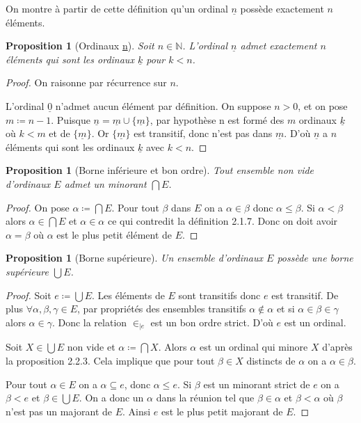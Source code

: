 \documentclass[french]{article}
\theoremstyle{definition}
\theoremstyle{plain}
\newtheorem{proposition}[subsubsection]{Proposition}
\theoremstyle{plain}
\theoremstyle{plain}
\theoremstyle{plain}
\theoremstyle{plain}
\begin{document}
On montre à partir de cette définition qu'un ordinal \( \underline{n} \) possède exactement \( n \) éléments.
\begin{proposition}[Ordinaux \underline{n}]
	Soit \( n \in \mathbb{N} \). L'ordinal \( \underline{n} \) admet exactement \( n \) éléments qui sont les ordinaux \( \underline{k} \) pour \( k < n \).
\end{proposition}
\begin{proof}
	On raisonne par récurrence sur \( n \). 
	
	L'ordinal \( \underline{0} \) n'admet aucun élément par définition.
	On suppose \( n > 0 \), et on pose \( m \coloneqq n - 1 \). Puisque \( \underline{n} = \underline{m} \cup \{\underline{m}\} \), par hypothèse n est formé des \( m \) ordinaux \( \underline{k} \) où \( k < m \) et de \( \{\underline{m}\} \). Or \( \{\underline{m}\} \) est transitif, donc n'est pas dans \( \underline{m} \). D'où \( \underline{n} \) a \( n \) éléments qui sont les ordinaux \( \underline{k} \) avec \( k < n \).
\end{proof}

\begin{proposition}[Borne inférieure et bon ordre]
	Tout ensemble non vide d'ordinaux \( E\) admet un minorant \( \bigcap E \).
\end{proposition}
\begin{proof}
	On pose \( \alpha \coloneqq \bigcap E \). Pour tout \( \beta \) dans \( E \) on a \( \alpha \in \beta \) donc \( \alpha \le \beta \). Si \( \alpha < \beta \) alors \( \alpha \in \bigcap E \) et \( \alpha \in \alpha \) ce qui contredit la définition 2.1.7. Donc on doit avoir \( \alpha = \beta \) où \( \alpha \) est le plus petit élément de \( E \).
\end{proof}
\begin{proposition}[Borne supérieure]
	Un ensemble d'ordinaux \( E \) possède une borne supérieure \( \bigcup E \). 
\end{proposition}
\begin{proof}
	Soit \( e \coloneqq \bigcup E \). Les éléments de \( E \) sont transitifs donc \( e \) est transitif. De plus \( \forall \alpha, \beta, \gamma \in E \), par propriétés des ensembles transitifs \( \alpha \notin \alpha  \) et si \( \alpha \in \beta \in \gamma \) alors \( \alpha \in \gamma \). Donc la relation \( \in_{|e} \) est un bon ordre strict. D'où \( e \) est un ordinal.

	Soit \( X \in \bigcup E \) non vide et \( \alpha \coloneqq \bigcap X \). Alors \( \alpha \) est un ordinal qui minore \( X \) d'après la proposition 2.2.3. Cela implique que pour tout \( \beta \in X \) distincts de \( \alpha \) on a \( \alpha \in \beta \). 

	Pour tout \( \alpha \in E \) on a \( \alpha \subseteq e \), donc \( \alpha \le e \). Si \( \beta \) est un minorant strict de \( e \) on a \( \beta < e \) et \( \beta \in \bigcup E \). On a donc un \( \alpha \) dans la réunion tel que \( \beta \in \alpha \) et \( \beta < \alpha \) où \( \beta \) n'est pas un majorant de \( E \). Ainsi \( e \) est le plus petit majorant de \( E \).
\end{proof}
\end{document}
